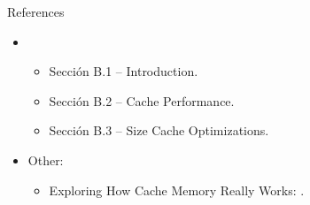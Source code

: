 \begin{frame}[t]{References}
\begin{itemize}
  \item \bibhennessy
    \begin{itemize}
       \item Sección B.1 -- Introduction.
       \item Sección B.2 -- Cache Performance.
       \item Sección B.3 -- Size Cache Optimizations.
    \end{itemize}

  \item Other:
    \begin{itemize}
      \item Exploring How Cache Memory Really Works:
            .
    \end{itemize}

\end{itemize}
\end{frame}
